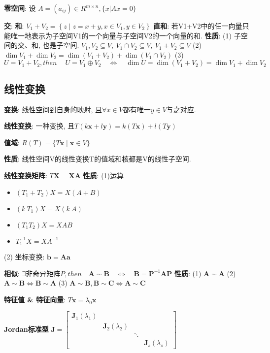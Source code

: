 \documentclass{article}
\newcommand{\bb}{\boldsymbol}
\begin{document}
        \textbf{零空间}: 设 $A = (a_{ij})\in R^{m×n}, \{x | Ax = 0\}$
        
        \textbf{交}: 
        \textbf{和}: $V_{1}+V_{2}=\left\{z \mid z=x+y, x \in V_{1}, y \in V_{2}\right\}$
        \textbf{直和}: 若V1+V2中的任一向量只能唯一地表示为子空间V1的一个向量与子空间V2的一个向量的和.
            \textbf{性质}: 
            (1) 子空间的交、和, 也是子空间. $V_1, V_2 \subseteq V,\ V_1 \cap V_2 \subseteq V,\ V_1 + V_2 \subseteq V$
            (2) $\operatorname{dim} V_{1}+\operatorname{dim} V_{2}=\operatorname{dim}\left(V_{1}+V_{2}\right)+\operatorname{dim}\left(V_{1} \cap V_{2}\right)$
            (3)  $U=V_{1} + V_{2}, then\ \quad U=V_{1} \oplus V_{2} \quad \Leftrightarrow \quad \operatorname{dim} U=\operatorname{dim}\left(V_{1}+V_{2}\right)=\operatorname{dim} V_{1}+\operatorname{dim} V_{2} $

        
    \subsection{线性变换}
        \textbf{变换}: 线性空间到自身的映射, 且$\forall x \in V$都有唯一$y \in V$与之对应.

        \textbf{线性变换}: 一种变换, 且$T(k \bb{x}+l \bb{y})=k(T \bb{x})+l(T \bb{y})$

        \textbf{值域}: $R(T)=\{T \bb{x} \mid \bb{x} \in V\}$

            \textbf{性质}: 线性空间V的线性变换T的值域和核都是V的线性子空间.

        \textbf{线性变换矩阵}: $T \bb X = \bb X \bb A$ 
            \textbf{性质}: 
            (1)运算
                \begin{itemize}
                    \item $(T_1 + T_2) X = X (A + B)$
                    \item $(k\ T_1) X = X (k\ A)$
                    \item $(T_1 T_2) X = X AB$
                    \item $T_1^{-1} X = X A^{-1}$
                \end{itemize}
            (2) 坐标变换: $\bb b = \bb A \bb a$

        \textbf{相似}: $\exists \text{非奇异矩阵}P, then \quad \bb A \sim \bb B \quad \Leftrightarrow \quad \bb B = \bb P^{-1} \bb A \bb P$
            \textbf{性质}: 
            (1) $\bb A \sim \bb A$ 
            (2) $\bb A \sim \bb B \Leftrightarrow \bb B \sim \bb A$ 
            (3) $\bb A \sim \bb B, \bb B \sim \bb C \Leftrightarrow \bb A \sim \bb C$

        \textbf{特征值 \& 特征向量}: $T \bb x = \lambda_0 \bb x$
        

        \textbf{Jordan标准型}
            $\bb{J}=\left[\begin{array}{llll}
                \bb{J}_{1}\left(\lambda_{1}\right) & & & \\
                & \bb{J}_{2}\left(\lambda_{2}\right) & & \\
                & & \ddots & \\
                & & & \bb{J}_{s}\left(\lambda_{s}\right)
                \end{array}\right]$
\end{document}
